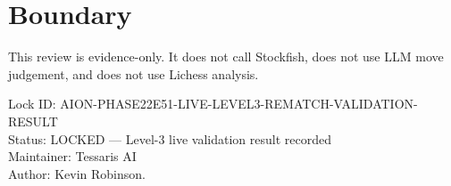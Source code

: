\documentclass[11pt,a4paper]{article}
\begin{document}
\section{Boundary}

This review is evidence-only. It does not call Stockfish, does not use LLM move judgement, and does not use Lichess analysis.

\bigskip

\noindent
Lock ID: AION-PHASE22E51-LIVE-LEVEL3-REMATCH-VALIDATION-RESULT\\
Status: LOCKED --- Level-3 live validation result recorded\\
Maintainer: Tessaris AI\\
Author: Kevin Robinson.
\end{document}
